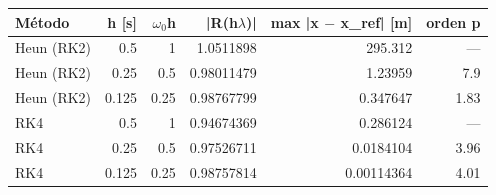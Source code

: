 {\footnotesize
\begin{longtable}{lrrrrr}
\toprule
\textbf{Método} & \textbf{h [s]} & \textbf{$\omega_{0}$h} & \textbf{|R(h$\lambda$)|} & \textbf{max |x $-$ x\_ref| [m]} & \textbf{orden p} \\
\midrule
\endhead
Heun (RK2) & 0.5 & 1 & 1.0511898 & 295.312 & — \\
Heun (RK2) & 0.25 & 0.5 & 0.98011479 & 1.23959 & 7.9 \\
Heun (RK2) & 0.125 & 0.25 & 0.98767799 & 0.347647 & 1.83 \\
RK4 & 0.5 & 1 & 0.94674369 & 0.286124 & — \\
RK4 & 0.25 & 0.5 & 0.97526711 & 0.0184104 & 3.96 \\
RK4 & 0.125 & 0.25 & 0.98757814 & 0.00114364 & 4.01 \\
\bottomrule
\end{longtable}
}
